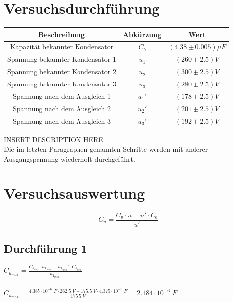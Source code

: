 \documentclass[a4paper,12pt]{article}
\begin{document}
\section{Versuchsdurchführung}
\begin{table}[H]
    \centering
    \begin{tabular}{|c|c|c|}
        \hline
        \textbf{Beschreibung} & \textbf{Abkürzung} & \textbf{Wert} \\
        \hline
        Kapazität bekannter Kondensator & $C_{b}$ & $(4.38\pm 0.005 )\mu F$\\
        \hline
        Spannung bekannter Kondensator 1 & $u_{1}$ & $(260\pm 2.5)V$\\
        Spannung bekannter Kondensator 2 & $u_{2}$ & $(300\pm 2.5)V$\\
        Spannung bekannter Kondensator 3 & $u_{3}$ & $(280\pm 2.5)V$\\
        \hline
        Spannung nach dem Ausgleich 1 & $u_{1}'$ & $(178\pm 2.5)V$\\
        Spannung nach dem Ausgleich 2 & $u_{2}'$ & $(201\pm 2.5)V$\\
        Spannung nach dem Ausgleich 3 & $u_{3}'$ & $(192\pm 2.5)V$\\
        \hline
    \end{tabular}
\end{table}

INSERT DESCRIPTION HERE\\

Die im letzten Paragraphen genannten Schritte werden mit anderer Ausgangspannung wiederholt durchgeführt.
\section{Versuchsauswertung}

$$C_u = \frac{C_b \cdot u - u' \cdot C_b}{u'}$$

\subsection{Durchführung 1}

$C_{u_{max}} = \displaystyle{\frac{C_{b_{max}}\cdot u_{1_{max}}-u_{1_{min}}'\cdot C_{b_{min}}}{u_{1_{min}}'}}$\\\\

$C_{u_{max}} = \displaystyle{\frac{4.385\cdot 10^{-6}\;F\cdot 262.5\;V-175.5\;V\cdot 4.375\cdot 10^{-6}\;F}{175.5\;V}} = 2.184\cdot 10^{-6}\;F$\\\\
\end{document}
